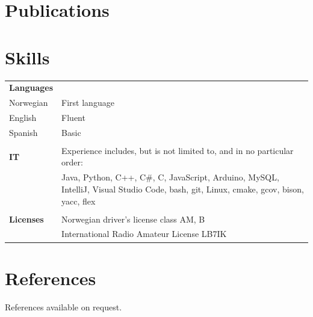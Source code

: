 \documentclass[a4paper,12pt]{article}
\begin{document}
\section{Publications}
\begin{refsection}
\nocite{*}
\printbibliography[heading=none]
\end{refsection}

\section{Skills}
\begin{tabularx}{\linewidth}{@{}l X@{}}
\textbf{Languages} & \hfill \\
    Norwegian & First language \\
    English & Fluent \\
    Spanish & Basic \\\\

\textbf{IT} & Experience includes, but is not limited to, and in no particular order:\\
& Java, Python, C++, C\#, C, JavaScript, Arduino, MySQL, IntelliJ, Visual Studio Code, bash, git, Linux, cmake, gcov, bison, yacc, flex \\\\
\textbf{Licenses} & Norwegian driver's license class AM, B \\
& International Radio Amateur License LB7IK
\end{tabularx}

\section{References}
References available on request.

\vfill
{}
\end{document}
